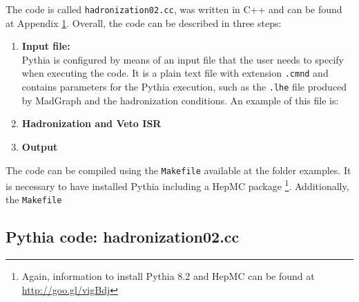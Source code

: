 \documentclass[12pt, oneside]{book}              %
\begin{document}
The code is called \texttt{hadronization02.cc}, was written in C++ and can be
found at Appendix \ref{App:hadronization02.cc}. Overall, the code can be described
in three steps:

\begin{enumerate}
\item \textbf{Input file:} 
\\Pythia is configured by means of an input file that the user
needs to specify when executing the code. It is a plain text file with extension
\texttt{.cmnd} and contains parameters for the Pythia execution, such as the \texttt{.lhe}
file produced by MadGraph and the hadronization conditions. An example of this file is:



\item  \textbf{Hadronization  and Veto ISR}

\item \textbf{Output}

\end{enumerate}

 The code can be compiled using the \texttt{Makefile} available at the folder
examples. It is necessary to have installed Pythia including a HepMC package 
\footnote{Again, information to install Pythia 8.2 and HepMC can be found at
\url{http://goo.gl/vigBdj}}. Additionally, the \texttt{Makefile}

\begin{appendices}
\chapter[Pythia code]{Pythia code: hadronization02.cc}\label{App:hadronization02.cc}

\end{appendices}





	
\end{document}
